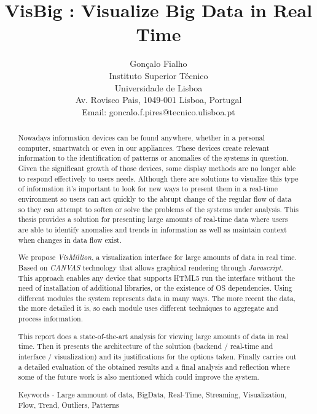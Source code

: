\documentclass[letterpaper, 10 pt, conference]{ieeeconf}  %
\title{\LARGE \bf
VisBig : Visualize Big Data in Real Time
}
\author{Gonçalo Fialho \\ 
        Instituto Superior Técnico \\
        Universidade de Lisboa \\ 
        Av. Rovisco Pais, 1049-001 Lisboa, Portugal \\
        Email: goncalo.f.pires@tecnico.ulisboa.pt }
\begin{document}
\maketitle
\thispagestyle{plain}
\pagestyle{plain}


\begin{abstract}

Nowadays information devices can be found anywhere, whether in a personal computer, smartwatch or even in our appliances. These devices create relevant information to the identification of patterns or anomalies of the systems in question. Given the significant growth of those devices, some display methods are no longer able to respond effectively to users needs. Although there are solutions to visualize this type of information it's important to look for new ways to present them in a real-time environment so users can act quickly to the abrupt change of the regular flow of data so they can attempt to soften or solve the problems of the systems under analysis. This thesis provides a solution for presenting large amounts of real-time data where users are able to identify anomalies and trends in information as well as maintain context when changes in data flow exist.

We propose \textit{VisMillion}, a visualization interface for large amounts of data in real time. Based on \textit{CANVAS} technology that allows graphical rendering through \textit{Javascript}. This approach enables any device that supports HTML5 run the interface without the need of installation of additional libraries, or the existence of OS dependencies. Using different modules the system represents data in many ways. The more recent the data, the more detailed it is, so each module uses different techniques to aggregate and process information. 

This report does a state-of-the-art analysis for viewing large amounts of data in real time. Then it presents the architecture of the solution (backend / real-time and interface / visualization) and its justifications for the options taken. Finally carries out a detailed evaluation of the obtained results and a final analysis and reflection where some of the future work is also mentioned which could improve the system.

Keywords -  Large ammount of data, BigData, Real-Time, Streaming, Visualization, Flow, Trend, Outliers, Patterns

\end{abstract}
\end{document}
